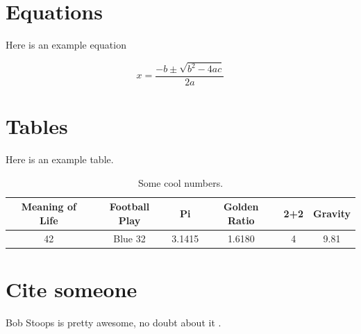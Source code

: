 \documentclass[letter,12pt,dissertation]{OUdissertation}
\begin{document}
\section{Equations}
\label{equations}

Here is an example equation

\begin{equation}
x = \frac{-b \pm \sqrt{b^2 - 4 ac}}{2a}
\end{equation}



\section{Tables}

Here is an example table.

\begin{table}[h]
\caption{Some cool numbers.}
\begin{tabular}{| c | c | c | c | c | c |}
\hline
\textbf{Meaning of Life} & \textbf{Football Play} & \textbf{Pi} & \textbf{Golden Ratio} & \textbf{2+2} & \textbf{Gravity}\\
\hline
42 & Blue 32 & 3.1415 & 1.6180 & 4 & 9.81\\
\hline
\end{tabular}
\label{table1}
\end{table}

\section{Cite someone}

Bob Stoops is pretty awesome, no doubt about it \citep{Stoops2015}.

\end{document}
